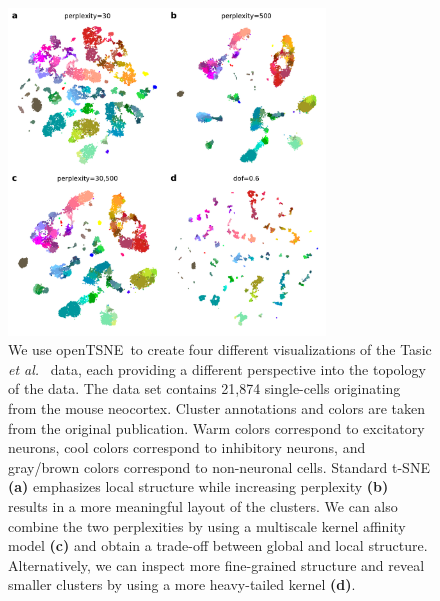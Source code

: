 \documentclass[twocolumn]{bmcart}
\newcommand{\opentsne}{\textsf{openTSNE}}
\begin{document}
\begin{figure}[htbp]
  \center
  \includegraphics[width=0.75\textwidth]{tasic2018}
  \caption{\label{fig:tasic}
  We use \opentsne\ to create four different
  visualizations of the Tasic \textit{et al.}~\cite{tasic2018shared} data,
  each providing a different perspective into the topology of the data.
  The data set contains 21,874 single-cells originating from the mouse
  neocortex. Cluster annotations and colors are taken from the original
  publication. Warm colors correspond to excitatory neurons, cool colors
  correspond to inhibitory neurons, and gray/brown colors correspond to
  non-neuronal cells. Standard t-SNE \textbf{(a)} emphasizes local
  structure while increasing perplexity \textbf{(b)} results in a more
  meaningful layout of the clusters. We can also combine the two
  perplexities by using a multiscale kernel affinity model \textbf{(c)}
  and obtain a trade-off between global and local structure.
  Alternatively, we can inspect more fine-grained structure and reveal
  smaller clusters by using a more heavy-tailed kernel \textbf{(d)}.}
\end{figure}
\end{document}
